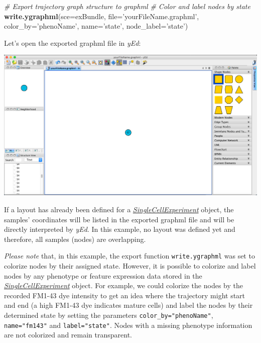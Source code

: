 \documentclass[]{book}
\newenvironment{Shaded}{\begin{snugshade}}{\end{snugshade}}
\newcommand{\KeywordTok}[1]{\textcolor[rgb]{0.13,0.29,0.53}{\textbf{#1}}}
\newcommand{\DataTypeTok}[1]{\textcolor[rgb]{0.13,0.29,0.53}{#1}}
\newcommand{\StringTok}[1]{\textcolor[rgb]{0.31,0.60,0.02}{#1}}
\newcommand{\CommentTok}[1]{\textcolor[rgb]{0.56,0.35,0.01}{\textit{#1}}}
\newcommand{\NormalTok}[1]{#1}
\theoremstyle{definition}
\theoremstyle{definition}
\theoremstyle{definition}
\theoremstyle{remark}
\begin{document}
\begin{Shaded}
\begin{Highlighting}[]
\CommentTok{# Export trajectory graph structure to graphml}
\CommentTok{# Color and label nodes by state}
\KeywordTok{write.ygraphml}\NormalTok{(}\DataTypeTok{sce=}\NormalTok{exBundle,}
               \DataTypeTok{file=}\StringTok{'yourFileName.graphml'}\NormalTok{,}
               \DataTypeTok{color_by=}\StringTok{'phenoName'}\NormalTok{,}
               \DataTypeTok{name=}\StringTok{'state'}\NormalTok{,}
               \DataTypeTok{node_label=}\StringTok{'state'}\NormalTok{)}
\end{Highlighting}
\end{Shaded}

Let's open the exported graphml file in \emph{yEd}:

\includegraphics[width=0.7\linewidth]{img/yEd_1}

If a layout has already been defined for a
\emph{\href{http://bioconductor.org/packages/SingleCellExperiment}{SingleCellExperiment}}
object, the samples' coordinates will be listed in the exported graphml
file and will be directly interpreted by \emph{yEd}. In this example, no
layout was defined yet and therefore, all samples (nodes) are
overlapping.

\emph{Please note} that, in this example, the export function
\texttt{write.ygraphml} was set to colorize nodes by their assigned
state. However, it is possible to colorize and label nodes by any
phenotype or feature expression data stored in the
\emph{\href{http://bioconductor.org/packages/SingleCellExperiment}{SingleCellExperiment}}
object. For example, we could colorize the nodes by the recorded FM1-43
dye intensity to get an idea where the trajectory might start and end (a
high FM1-43 dye indicates mature cells) and label the nodes by their
determined state by setting the parameters
\texttt{color\_by="phenoName"}, \texttt{name="fm143"} and
\texttt{label="state"}. Nodes with a missing phenotype information are
not colorized and remain transparent.
\end{document}
